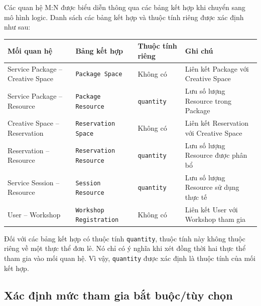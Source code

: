 Các quan hệ M:N được biểu diễn thông qua các bảng kết hợp khi chuyển sang mô hình logic. Danh sách các bảng kết hợp và thuộc tính riêng được xác định như sau:

\begin{center}

\scriptsize

\begin{tabular}{p{.23\linewidth} p{.20\linewidth} p{.14\linewidth} p{.28\linewidth}}

\toprule

Mối quan hệ & Bảng kết hợp & Thuộc tính riêng & Ghi chú \\

\midrule

Service Package -- Creative Space & \texttt{Package Space} & Không có & Liên kết Package với Creative Space \\

Service Package -- Resource & \texttt{Package Resource} & \texttt{quantity} & Lưu số lượng Resource trong Package \\

Creative Space -- Reservation & \texttt{Reservation Space} & Không có & Liên kết Reservation với Creative Space \\

Reservation -- Resource & \texttt{Reservation Resource} & \texttt{quantity} & Lưu số lượng Resource được phân bổ \\

Service Session -- Resource & \texttt{Session Resource} & \texttt{quantity} & Lưu số lượng Resource sử dụng thực tế \\

User -- Workshop & \texttt{Workshop Registration} & Không có & Liên kết User với Workshop tham gia \\

\bottomrule

\end{tabular}

\end{center}

Đối với các bảng kết hợp có thuộc tính \texttt{quantity}, thuộc tính này không thuộc riêng về một thực thể đơn lẻ. Nó chỉ có ý nghĩa khi xét đồng thời hai thực thể tham gia vào mối quan hệ. Vì vậy, \texttt{quantity} được xác định là thuộc tính của mối kết hợp.

\subsection{Xác định mức tham gia bắt buộc/tùy chọn}

